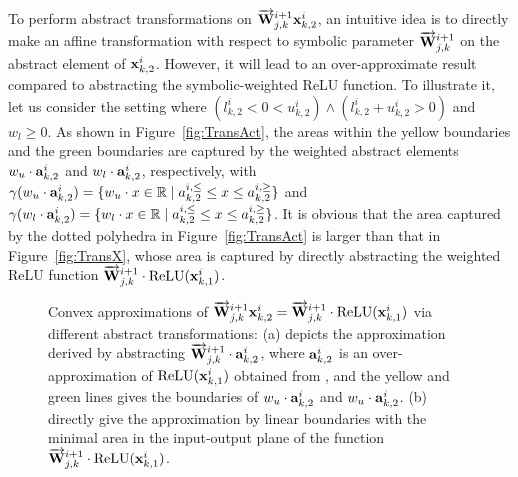 To perform abstract transformations on $\overrightarrow{{\mathbf{W}}}^{i+1}_{j,k}{\mathbf{x}}^i_{k,2}$, an intuitive idea is to directly make an affine transformation with respect to symbolic parameter $\overrightarrow{{\mathbf{W}}}^{i+1}_{j,k}$ on the abstract element of ${\mathbf{x}}^i_{k,2}$. However, it will lead to an over-approximate result compared to abstracting the symbolic-weighted ReLU function.
% 
To illustrate it, let us consider the setting where $(l^i_{k,2}<0<u^i_{k,2})\wedge(l^i_{k,2}+u^i_{k,2}>0)$ and $w_l\ge 0$. As shown in Figure~\ref{fig:TransAct}, the areas within the yellow boundaries and the green boundaries are captured by the weighted abstract elements $w_u\cdot {\mathbf{a}}^{i}_{k,2}$ and $w_l\cdot{\mathbf{a}}^{i}_{k,2}$, respectively, with $\gamma(w_u\cdot{\mathbf{a}}^{i}_{k,2})=\{ w_u  \cdot x \in\mathbb{R} \mid a^{i,\le}_{k,2}\le  x\le a^{i,\ge}_{k,2} \}$ and $\gamma(w_l\cdot{\mathbf{a}}^{i}_{k,2})=\{ w_l \cdot x \in\mathbb{R} \mid a^{i,\le}_{k,2}\le  x\le a^{i,\ge}_{k,2} \}$. 
It is obvious that the area captured by the dotted polyhedra in Figure~\ref{fig:TransAct} is larger than that in Figure~\ref{fig:TransX}, whose area is captured by directly abstracting the weighted ReLU function $\overrightarrow{{\mathbf{W}}}^{i+1}_{j,k}\cdot \text{ReLU}({\mathbf{x}}^i_{k,1})$.


\begin{figure*}[t]
	\centering
        \hspace{5mm}
        \vspace{-2mm}
        \caption{Convex approximations of $\overrightarrow{{\mathbf{W}}}^{i+1}_{j,k}{\mathbf{x}}^i_{k,2}=\overrightarrow{{\mathbf{W}}}^{i+1}_{j,k}\cdot \text{ReLU}({\mathbf{x}}^i_{k,1})$ via different abstract transformations: (a) depicts the approximation derived by abstracting $\overrightarrow{{\mathbf{W}}}^{i+1}_{j,k}\cdot {\mathbf{a}}^i_{k,2}$, where ${\mathbf{a}}^i_{k,2}$ is an over-approximation of $\text{ReLU}({\mathbf{x}}^i_{k,1})$ obtained from \deepPoly, and the yellow and green lines gives the boundaries of $w_u\cdot {\mathbf{a}}^i_{k,2}$ and $w_u\cdot {\mathbf{a}}^i_{k,2}$. (b) directly give the approximation by linear boundaries with the minimal area in the input-output plane of the function $\overrightarrow{{\mathbf{W}}}^{i+1}_{j,k}\cdot \text{ReLU}({\mathbf{x}}^i_{k,1})$.}
    \label{fig:abstrDomains}
\end{figure*}

